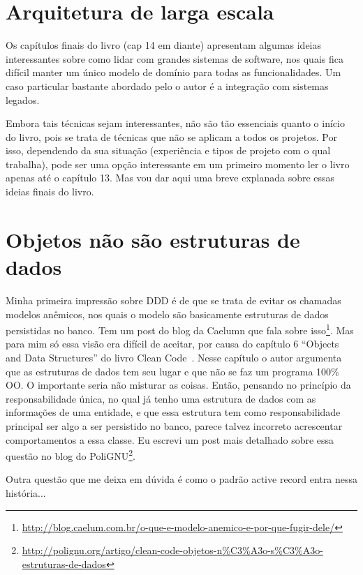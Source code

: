 \documentclass[a4paper, 12pt]{article}
\begin{document}
\section{Arquitetura de larga escala}

Os capítulos finais do livro (cap 14 em diante) apresentam algumas ideias interessantes sobre como lidar com grandes sistemas de software, nos quais fica difícil manter um único modelo de domínio para todas as funcionalidades. Um caso particular bastante abordado pelo o autor é a integração com sistemas legados.

Embora tais técnicas sejam interessantes, não são tão essenciais quanto o início do livro, pois se trata de técnicas que não se aplicam a todos os projetos. Por isso, dependendo da sua situação (experiência e tipos de projeto com o qual trabalha), pode ser uma opção interessante em um primeiro momento ler o livro apenas até o capítulo 13. Mas vou dar aqui uma breve explanada sobre essas ideias finais do livro.

\section{Objetos não são estruturas de dados}

Minha primeira impressão sobre DDD é de que se trata de evitar os chamadas modelos anêmicos, nos quais o modelo são basicamente estruturas de dados persistidas no banco. Tem um post do blog da Caelumn que fala sobre isso\footnote{\url{http://blog.caelum.com.br/o-que-e-modelo-anemico-e-por-que-fugir-dele/}}. Mas para mim só essa visão era difícil de aceitar, por causa do capítulo 6 ``Objects and Data Structures'' do livro Clean Code~\cite{Bob2008Clean}. Nesse capítulo o autor argumenta que as estruturas de dados tem seu lugar e que não se faz um programa 100\% OO. O importante seria não misturar as coisas. Então, pensando no princípio da responsabilidade única, no qual já tenho uma estrutura de dados com as informações de uma entidade, e que essa estrutura tem como responsabilidade principal ser algo a ser persistido no banco, parece talvez incorreto acrescentar comportamentos a essa classe. Eu escrevi um post mais detalhado sobre essa questão no blog do PoliGNU\footnote{\url{http://polignu.org/artigo/clean-code-objetos-n\%C3\%A3o-s\%C3\%A3o-estruturas-de-dados}}.

Outra questão que me deixa em dúvida é como o padrão active record entra nessa história...



  
\end{document}
